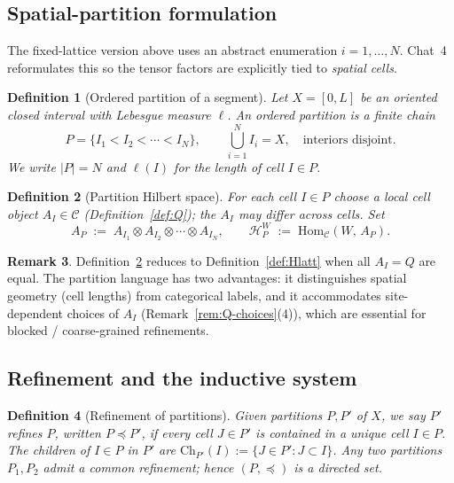 \documentclass[11pt,a4paper]{article}
\newtheorem{definition}{Definition}[section]
\theoremstyle{definition}
\newtheorem{remark}[definition]{Remark}
\newcommand{\Cc}{\mathcal{C}}
\newcommand{\Hh}{\mathcal{H}}
\newcommand{\Hom}{\mathrm{Hom}}
\begin{document}
\subsection{Spatial-partition formulation}

The fixed-lattice version above uses an abstract enumeration $i=1,\dots,N$.
Chat~4 reformulates this so the tensor factors are explicitly tied to
\emph{spatial cells}.

\begin{definition}[Ordered partition of a segment]\label{def:partition}
Let $X = [0,L]$ be an oriented closed interval with Lebesgue measure $\ell$.
An \emph{ordered partition} is a finite chain
\[
P = \{ I_1 < I_2 < \cdots < I_N \}, \qquad
\bigcup_{i=1}^{N} I_i = X,\quad \text{interiors disjoint}.
\]
We write $|P| = N$ and $\ell(I)$ for the length of cell $I\in P$.
\end{definition}

\begin{definition}[Partition Hilbert space]\label{def:HP}
For each cell $I\in P$ choose a local cell object $A_I\in\Cc$
(Definition~\ref{def:Q}); the $A_I$ may differ across cells. Set
\[
A_P \;:=\; A_{I_1}\otimes A_{I_2}\otimes\cdots\otimes A_{I_N}, \qquad
\Hh_P^{W} \;:=\; \Hom_\Cc(W,\,A_P).
\]
\end{definition}

\begin{remark}
Definition~\ref{def:HP} reduces to Definition~\ref{def:Hlatt} when all
$A_I = Q$ are equal. The partition language has two advantages: it
distinguishes spatial geometry (cell lengths) from categorical labels, and
it accommodates site-dependent choices of $A_I$ (Remark~\ref{rem:Q-choices}(4)),
which are essential for blocked / coarse-grained refinements.
\end{remark}

\subsection{Refinement and the inductive system}

\begin{definition}[Refinement of partitions]\label{def:refine}
Given partitions $P,P'$ of $X$, we say $P'$ \emph{refines} $P$, written
$P\preceq P'$, if every cell $J\in P'$ is contained in a unique cell
$I\in P$. The \emph{children} of $I\in P$ in $P'$ are
$\mathrm{Ch}_{P'}(I) := \{J\in P' : J\subset I\}$. Any two partitions
$P_1,P_2$ admit a common refinement; hence $(P,\preceq)$ is a directed set.
\end{definition}
\end{document}

